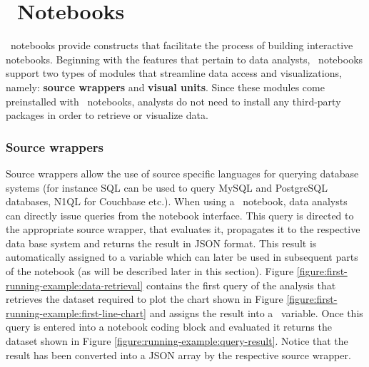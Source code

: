 
\section{\projname\ Notebooks}

\projname\ notebooks provide constructs that facilitate the process of building interactive notebooks. Beginning with the features that pertain to data analysts, \projname\ notebooks support two types of modules that streamline data access and visualizations, namely: \textbf{source wrappers} and \textbf{visual units}. Since these modules come preinstalled with \projname\ notebooks, analysts do not need to install any third-party packages in order to retrieve or visualize data. 




\subsubsection*{Source wrappers}

Source wrappers allow the use of source specific languages for querying database systems (for instance SQL can be used to query MySQL and PostgreSQL databases, N1QL for Couchbase etc.). When using a \projname\ notebook, data analysts can directly issue queries from the notebook interface. This query is directed to the appropriate source wrapper, that evaluates it, propagates it to the respective data base system and returns the result in JSON format. This result is automatically assigned to a variable which can later be used in subsequent parts of the notebook (as will be described later in this section). Figure \ref{figure:first-running-example:data-retrieval} contains the first query of the analysis that retrieves the dataset required to plot the chart shown in Figure \ref{figure:first-running-example:first-line-chart} and assigns the result into a \projname\ variable. Once this query is entered into a notebook coding block and evaluated it returns the dataset shown in Figure \ref{figure:running-example:query-result}. Notice that the result has been converted into a JSON array by the respective source wrapper. 

